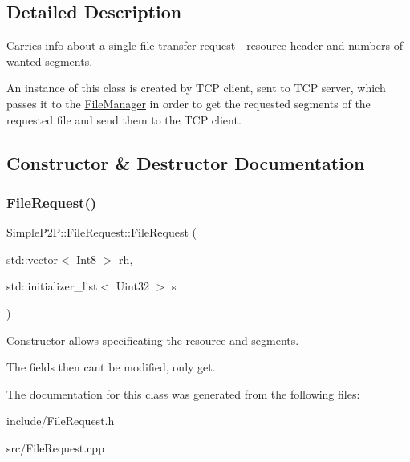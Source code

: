 \subsection{Detailed Description}
Carries info about a single file transfer request -\/ resource header and numbers of wanted segments. 

An instance of this class is created by T\+CP client, sent to T\+CP server, which passes it to the \hyperlink{classSimpleP2P_1_1FileManager}{File\+Manager} in order to get the requested segments of the requested file and send them to the T\+CP client. 

\subsection{Constructor \& Destructor Documentation}
\mbox{\label{classSimpleP2P_1_1FileRequest_a6e50d4f7d07a46ddcd72745ebc6e9e81}} 
\subsubsection{\texorpdfstring{File\+Request()}{FileRequest()}}
{\footnotesize\ttfamily Simple\+P2\+P\+::\+File\+Request\+::\+File\+Request (\begin{DoxyParamCaption}\item[{std\+::vector$<$ Int8 $>$}]{rh,  }\item[{std\+::initializer\+\_\+list$<$ Uint32 $>$}]{s }\end{DoxyParamCaption})}



Constructor allows specificating the resource and segments. 

The fields then can\textquotesingle{}t be modified, only get. 

The documentation for this class was generated from the following files\+:\begin{DoxyCompactItemize}
\item 
include/File\+Request.\+h\item 
src/File\+Request.\+cpp\end{DoxyCompactItemize}
